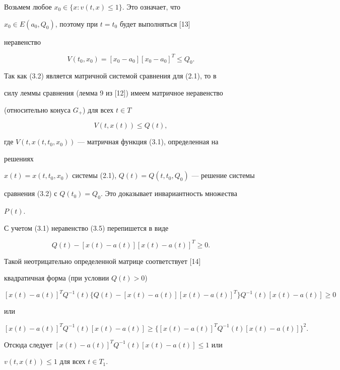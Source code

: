 \begin{pf} 


Возьмем любое $x_0\in\{x:v(t,x)\le1\}$. Это означает, что 


$x_0\in E(a_0,Q_0)$, поэтому при $t=t_0$ будет выполняться [13] 


неравенство 


$$ 


V(t_0,x_0)=[x_0-a_0][x_0-a_0]^T\le Q_0. 


$$ 


Так как (3.2) является матричной системой сравнения для (2.1), то в 


силу леммы сравнения (лемма 9 из [12]) имеем матричное неравенство 


(относительно конуса $G_+$) для всех $t\in T$ 


\begin{equation} 


V(t,x(t))\le Q(t), 


\end{equation} 


где $V(t,x(t,t_0,x_0))$ --- матричная функция (3.1), определенная на 


решениях 


$x(t)=x(t,t_0,x_0)$ системы (2.1), $Q(t)=Q(t,t_0,Q_0)$ --- решение системы 


сравнения (3.2) с $Q(t_0)=Q_0$. Это доказывает инвариантность множества 


$P(t)$. 


 


С учетом (3.1) неравенство (3.5) перепишется в виде 


$$ 


Q(t)-[x(t)-a(t)][x(t)-a(t)]^T\ge0. 


$$ 


Такой неотрицательно определенной матрице соответствует [14] 


квадратичная форма (при условии $Q(t)>0$) 


$$ 


[x(t)-a(t)]^T Q^{-1}(t)\{Q(t)-[x(t)-a(t)] 


[x(t)-a(t)]^T\}Q^{-1}(t)[x(t)-a(t)]\ge0 


$$ 


или 


$$ 


[x(t)-a(t)]^T Q^{-1}(t)[x(t)-a(t)]\ge 


\{[x(t)-a(t)]^T Q^{-1}(t)[x(t)-a(t)]\}^2. 


$$ 


Отсюда следует $[x(t)-a(t)]^T Q^{-1}(t)[x(t)-a(t)]\le1$ или 


$v(t,x(t))\le1$ для всех $t\in T_1$. 


\end{pf} 


